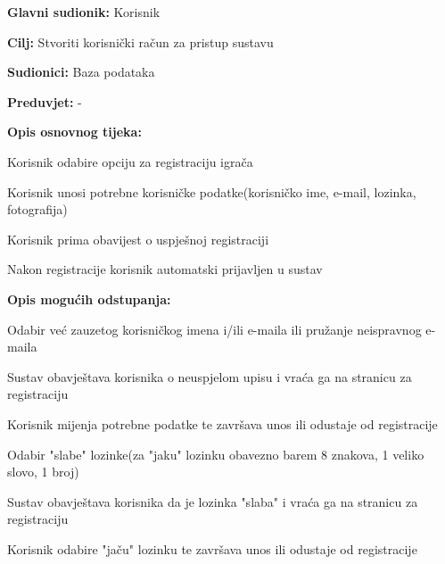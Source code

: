 					
					\noindent {}
					\begin{packed_item}
	
						\item \textbf{Glavni sudionik: }Korisnik
						\item  \textbf{Cilj:} Stvoriti korisnički račun za pristup sustavu
						\item  \textbf{Sudionici:} Baza podataka
						\item  \textbf{Preduvjet:} -
						\item  \textbf{Opis osnovnog tijeka:}
						
						\item[] \begin{packed_enum}
	
							\item Korisnik odabire opciju za registraciju igrača
							\item Korisnik unosi potrebne korisničke podatke(korisničko ime, e-mail, lozinka, fotografija)
							\item Korisnik prima obavijest o uspješnoj registraciji
							\item Nakon registracije korisnik automatski prijavljen u sustav
						\end{packed_enum}
						
						\item  \textbf{Opis mogućih odstupanja:}
						
						\item[] \begin{packed_item}
	
							\item Odabir već zauzetog korisničkog imena i/ili e-maila ili pružanje neispravnog e-maila
							\item[] \begin{packed_enum}
								
								\item Sustav obavještava korisnika o neuspjelom upisu i vraća ga na stranicu za registraciju 
								\item Korisnik mijenja potrebne podatke te završava unos ili odustaje od registracije
								
							\end{packed_enum}
							\item Odabir "slabe" lozinke(za "jaku" lozinku obavezno barem 8 znakova, 1 veliko slovo, 1 broj)
							\item[] \begin{packed_enum}
								\item Sustav obavještava korisnika da je lozinka "slaba" i vraća ga na stranicu za registraciju
								\item Korisnik odabire "jaču" lozinku te završava unos ili odustaje od registracije 
								
							\end{packed_enum}
								
						\end{packed_item}
					\end{packed_item}
				
